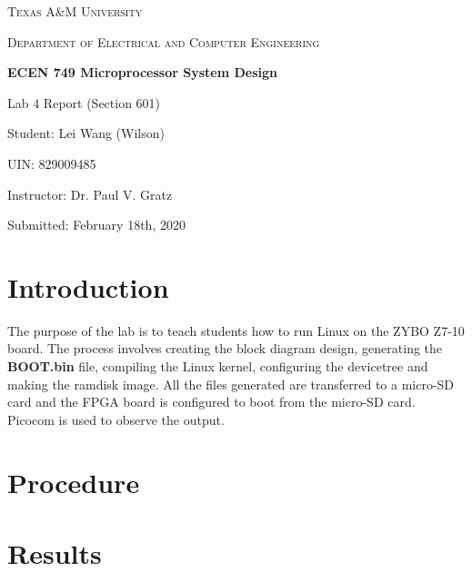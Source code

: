 \documentclass[11pt,letterpaper,titlepage]{article}
\begin{document}
\begin{titlepage}
  \centering
	{\scshape\large Texas A\&M University \par}
	\vspace{1cm}
	{\scshape\Large Department of Electrical and Computer Engineering \par}
	\vspace{4cm}
    \vspace{0.5cm}
	{\huge\bfseries ECEN 749 Microprocessor System Design\par}
	\vspace{4cm}
	{\Large Lab 4 Report (Section 601)\par}
	\vspace{1cm}
	{\Large Student: Lei Wang (Wilson)\par}
	\vspace{1cm}
	{\Large UIN: 829009485\par}
	\vspace{1cm}
	{\Large Instructor: Dr. Paul V. Gratz\par}
	\vspace{4cm}
	\vfill

	{\large Submitted: February 18th, 2020 \par}

\end{titlepage}

\newpage

\tableofcontents{}

\newpage

\part{Introduction}

The purpose of the lab is to teach students how to run Linux on the ZYBO Z7-10 board. The process involves creating the block diagram design, generating the \textbf{BOOT.bin} file, compiling the Linux kernel, configuring the devicetree and making the ramdisk image. All the files generated are transferred to a micro-SD card and the FPGA board is configured to boot from the micro-SD card. Picocom is used to observe the output.

\part{Procedure}


\newpage

\part{Results}
\end{document}
